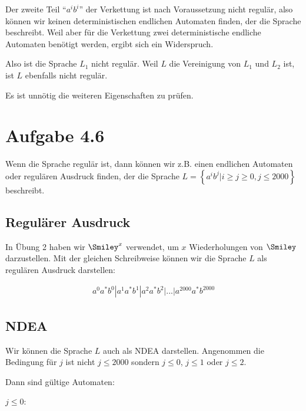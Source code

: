 \documentclass{article}
\begin{document}
Der zweite Teil "`$a^ib^i$"' der Verkettung ist nach Voraussetzung nicht regulär, also können wir keinen deterministischen endlichen Automaten finden, der die Sprache beschreibt. Weil aber für die Verkettung zwei deterministische endliche Automaten benötigt werden, ergibt sich ein Widerspruch.

Also ist die Sprache $L_1$ nicht regulär. Weil $L$ die Vereinigung von $L_1$ und $L_2$ ist, ist $L$ ebenfalls nicht regulär.

Es ist unnötig die weiteren Eigenschaften zu prüfen.



\section*{Aufgabe 4.6}
Wenn die Sprache regulär ist, dann können wir z.B. einen endlichen Automaten oder regulären Ausdruck finden, der die Sprache $L = \left\{a^ib^j | i \geq j \geq 0, j \leq 2000 \right\}$ beschreibt.

\subsection*{Regulärer Ausdruck}
In Übung 2 haben wir $\Smiley^x$ verwendet, um $x$ Wiederholungen von $\Smiley$ darzustellen. Mit der gleichen Schreibweise können wir die Sprache $L$ als regulären Ausdruck darstellen:

\begin{align*}
a^0a^*b^0|a^1a^*b^1|a^2a^*b^2|...|a^{2000}a^*b^{2000}
\end{align*}

\subsection*{NDEA}
Wir können die Sprache $L$ auch als NDEA darstellen. Angenommen die Bedingung für $j$ ist nicht $j \leq 2000$ sondern $j \leq 0$, $j\leq 1$ oder $j \leq 2$.

Dann sind gültige Automaten:

$j \leq 0$:

\begin{center}
\end{center}
\end{document}
